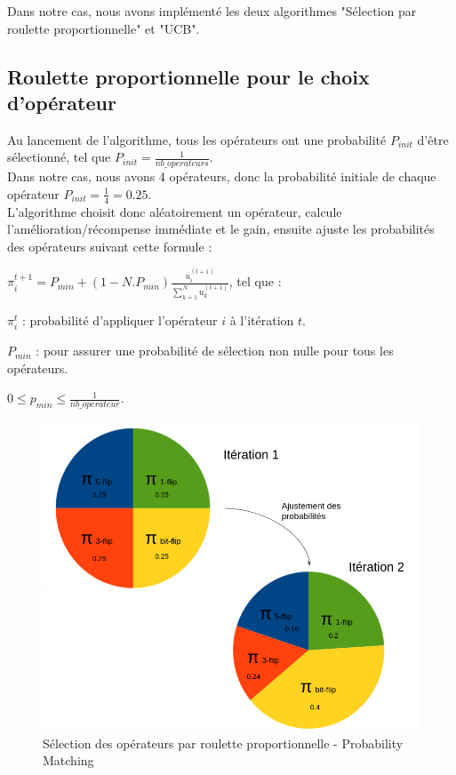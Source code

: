 \documentclass[12pt]{article}
\begin{document}
\par Dans notre cas, nous avons implémenté les deux algorithmes "Sélection par roulette proportionnelle" et "UCB".


	\subsection{Roulette proportionnelle pour le choix d'opérateur}
	Au lancement de l'algorithme, tous les opérateurs ont une probabilité $ P_{init}$ d'être sélectionné, tel que $ P_{init} = \frac{1}{nb\_operateurs} $.\\
	
	Dans notre cas, nous avons 4 opérateurs, donc la probabilité initiale de chaque opérateur $ P_{init} = \frac{1}{4} = 0.25 $.\\
	
	L'algorithme choisit donc aléatoirement un opérateur, calcule l'amélioration/récompense immédiate et le gain, ensuite ajuste les probabilités des opérateurs suivant cette formule :\\
	\par $ \pi_i^{t+1} = P_{min} + (1 - N.P_{min} ) \frac{u_i^{(t+1)}}{\sum_{k=1}^N u_k^{(t+1)}} $, tel que : \\
	\par$ \pi_i^{t} $ : probabilité d'appliquer l'opérateur $i$ à l'itération $t$.\\
	\par $ P_{min} $ :  pour assurer une probabilité de sélection non nulle pour tous les opérateurs.\\ 
	\par $ 0 \leq p_{min} \leq \frac{1}{nb\_operateur} $.\\
	
\begin{figure}[H]
	\begin{center}
		\includegraphics[scale=0.5]{img/pm.png}
		\caption{Sélection des opérateurs par roulette proportionnelle - Probability Matching}
		\label{pm}
	\end{center}
\end{figure}
	
\end{document}
